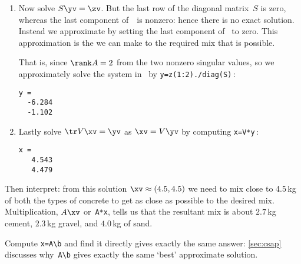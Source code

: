 \begin{reduce}
\begin{example}
\begin{solution}
\begin{enumerate}
\item Now solve \(S\yv=\zv\).
But the last row of the diagonal matrix~\(S\) is zero, whereas the last component of~\zv\ is nonzero: hence there is no exact solution. 
Instead we approximate by setting the last component of \zv\ to zero.
This approximation is the \emph{} we can make to the required mix that is possible.

That is, since \(\rank A=2\) from the two nonzero singular values, so we approximately solve the system in \script\ by \verb|y=z(1:2)./diag(S)|\,:
\begin{verbatim}
y =
  -6.284
  -1.102
\end{verbatim}

\item Lastly solve \(\tr V\xv=\yv\) as \(\xv=V\yv\) by computing \verb|x=V*y|\,:
\begin{verbatim}
x =
   4.543
   4.479
\end{verbatim}
\end{enumerate}
Then interpret: from this solution \(\xv\approx(4.5,4.5)\) we need to mix close to 4.5\,kg of both the types of concrete to get as close as possible to the desired mix.
Multiplication, \(A\xv\) or~\verb|A*x|, tells us that the resultant mix is about \(2.7\)\,kg cement, \(2.3\)\,kg gravel, and \(4.0\)\,kg of sand.

Compute \verb|x=A\b| and find it directly gives exactly the same answer: \autoref{sec:csap} discusses why~\verb|A\b| gives exactly the same `best' approximate solution. 
\end{solution}
\end{example}
\end{reduce}






